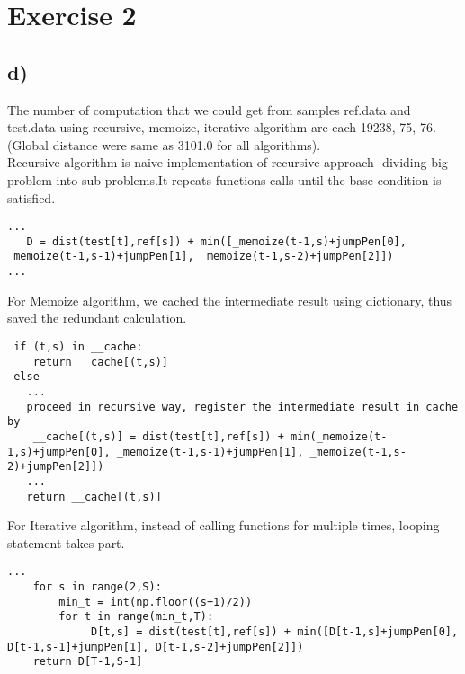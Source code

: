 \section*{Exercise 2} %
\label{sec:Exercise 2}

\subsection*{d)} %
\label{sub:d}
The number of computation that we could get from samples ref.data and test.data using recursive, memoize, iterative algorithm are each 19238, 75, 76. 
(Global distance were same as 3101.0 for all algorithms). \\

Recursive algorithm is naive implementation of recursive approach- dividing big problem into sub problems.It repeats functions calls until the base condition is satisfied.

\begin{lstlisting}
...
   D = dist(test[t],ref[s]) + min([_memoize(t-1,s)+jumpPen[0],                       _memoize(t-1,s-1)+jumpPen[1], _memoize(t-1,s-2)+jumpPen[2]])
...
\end{lstlisting}

For Memoize algorithm, we cached the intermediate result using dictionary, thus saved the redundant calculation. 
\begin{lstlisting}
 if (t,s) in __cache:
    return __cache[(t,s)]
 else
   ...
   proceed in recursive way, register the intermediate result in cache by
    __cache[(t,s)] = dist(test[t],ref[s]) + min(_memoize(t-1,s)+jumpPen[0], _memoize(t-1,s-1)+jumpPen[1], _memoize(t-1,s-2)+jumpPen[2]])
   ...
   return __cache[(t,s)]
\end{lstlisting}

For Iterative algorithm, instead of calling functions for multiple times, looping statement takes part. 
\begin{lstlisting}
...
    for s in range(2,S):
        min_t = int(np.floor((s+1)/2))
    	for t in range(min_t,T):
   			 D[t,s] = dist(test[t],ref[s]) + min([D[t-1,s]+jumpPen[0], D[t-1,s-1]+jumpPen[1], D[t-1,s-2]+jumpPen[2]])
    return D[T-1,S-1] 
\end{lstlisting}




